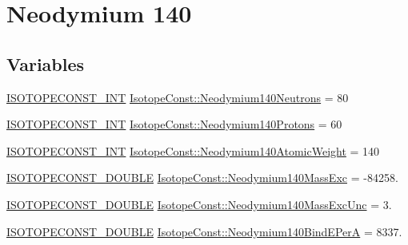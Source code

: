 \hypertarget{group___isotope_const-_neodymium-_nd140}{}\section{Neodymium 140}
\label{group___isotope_const-_neodymium-_nd140}
\subsection*{Variables}
\begin{DoxyCompactItemize}
\item 
\mbox{\hyperlink{group___isotope_const-_macros_ga5f18360b3e99483a35c32d789e62621c}{I\+S\+O\+T\+O\+P\+E\+C\+O\+N\+S\+T\+\_\+\+I\+NT}} \mbox{\hyperlink{group___isotope_const-_neodymium-_nd140_ga2c43a59d76a721b5e8a730bf8298f1c2}{Isotope\+Const\+::\+Neodymium140\+Neutrons}} = 80
\item 
\mbox{\hyperlink{group___isotope_const-_macros_ga5f18360b3e99483a35c32d789e62621c}{I\+S\+O\+T\+O\+P\+E\+C\+O\+N\+S\+T\+\_\+\+I\+NT}} \mbox{\hyperlink{group___isotope_const-_neodymium-_nd140_gad70b95fc297d441747f401656e0e123c}{Isotope\+Const\+::\+Neodymium140\+Protons}} = 60
\item 
\mbox{\hyperlink{group___isotope_const-_macros_ga5f18360b3e99483a35c32d789e62621c}{I\+S\+O\+T\+O\+P\+E\+C\+O\+N\+S\+T\+\_\+\+I\+NT}} \mbox{\hyperlink{group___isotope_const-_neodymium-_nd140_ga1f9915e47ce5ee1128db420a1ddb6270}{Isotope\+Const\+::\+Neodymium140\+Atomic\+Weight}} = 140
\item 
\mbox{\hyperlink{group___isotope_const-_macros_ga8f45a7272ce02c0b4c65c44636ed719a}{I\+S\+O\+T\+O\+P\+E\+C\+O\+N\+S\+T\+\_\+\+D\+O\+U\+B\+LE}} \mbox{\hyperlink{group___isotope_const-_neodymium-_nd140_ga88052fca3297291d6bcd126483206094}{Isotope\+Const\+::\+Neodymium140\+Mass\+Exc}} = -\/84258.
\item 
\mbox{\hyperlink{group___isotope_const-_macros_ga8f45a7272ce02c0b4c65c44636ed719a}{I\+S\+O\+T\+O\+P\+E\+C\+O\+N\+S\+T\+\_\+\+D\+O\+U\+B\+LE}} \mbox{\hyperlink{group___isotope_const-_neodymium-_nd140_gaef9f911e6a8f86ac7a4fb40c7d942031}{Isotope\+Const\+::\+Neodymium140\+Mass\+Exc\+Unc}} = 3.
\item 
\mbox{\hyperlink{group___isotope_const-_macros_ga8f45a7272ce02c0b4c65c44636ed719a}{I\+S\+O\+T\+O\+P\+E\+C\+O\+N\+S\+T\+\_\+\+D\+O\+U\+B\+LE}} \mbox{\hyperlink{group___isotope_const-_neodymium-_nd140_gade840fdd9c669331564bd3ded427d564}{Isotope\+Const\+::\+Neodymium140\+Bind\+E\+PerA}} = 8337.
\item 

\end{DoxyCompactItemize}
